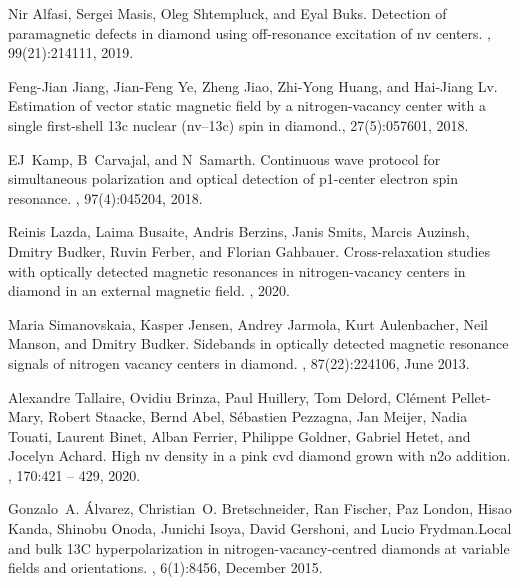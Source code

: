 \documentclass[9pt,twocolumn,twoside]{revtex4-1}
\begin{document}
\begin{thebibliography}{1}

Nir Alfasi, Sergei Masis, Oleg Shtempluck, and Eyal Buks.
\newblock Detection of paramagnetic defects in diamond using off-resonance
  excitation of nv centers.
, 99(21):214111, 2019.

Feng-Jian Jiang, Jian-Feng Ye, Zheng Jiao, Zhi-Yong Huang, and Hai-Jiang Lv.
\newblock Estimation of vector static magnetic field by a nitrogen-vacancy
  center with a single first-shell 13c nuclear (nv--13c) spin in diamond., 27(5):057601, 2018.

EJ~Kamp, B~Carvajal, and N~Samarth.
\newblock Continuous wave protocol for simultaneous polarization and optical
  detection of p1-center electron spin resonance.
, 97(4):045204, 2018.

Reinis Lazda, Laima Busaite, Andris Berzins, Janis Smits, Marcis Auzinsh,  Dmitry Budker, Ruvin Ferber, and Florian Gahbauer.
\newblock Cross-relaxation studies with optically detected magnetic resonances
  in nitrogen-vacancy centers in diamond in an external magnetic field.
, 2020.

Maria Simanovskaia, Kasper Jensen, Andrey Jarmola, Kurt Aulenbacher, Neil  Manson, and Dmitry Budker.
\newblock Sidebands in optically detected magnetic resonance signals of
  nitrogen vacancy centers in diamond.
, 87(22):224106, June 2013.

Alexandre Tallaire, Ovidiu Brinza, Paul Huillery, Tom Delord, Clément
  Pellet-Mary, Robert Staacke, Bernd Abel, Sébastien Pezzagna, Jan Meijer,
  Nadia Touati, Laurent Binet, Alban Ferrier, Philippe Goldner, Gabriel Hetet,
  and Jocelyn Achard.
\newblock High nv density in a pink cvd diamond grown with n2o addition.
, 170:421 -- 429, 2020.

Gonzalo~A. Álvarez, Christian~O. Bretschneider, Ran Fischer, Paz London, Hisao
  Kanda, Shinobu Onoda, Junichi Isoya, David Gershoni, and Lucio Frydman.\newblock Local and bulk {13C} hyperpolarization in nitrogen-vacancy-centred
  diamonds at variable fields and orientations.
, 6(1):8456, December 2015.

\end{thebibliography}
\end{document}
